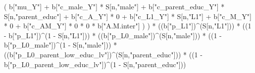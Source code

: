 \documentclass[
]{book}
\newenvironment{Shaded}{\begin{snugshade}}{\end{snugshade}}
\newcommand{\DecValTok}[1]{\textcolor[rgb]{0.00,0.00,0.81}{#1}}
\newcommand{\NormalTok}[1]{#1}
\newcommand{\SpecialCharTok}[1]{\textcolor[rgb]{0.00,0.00,0.00}{#1}}
\newcommand{\StringTok}[1]{\textcolor[rgb]{0.31,0.60,0.02}{#1}}
\begin{document}
\begin{Shaded}
\begin{Highlighting}[]
\NormalTok{                          ( b[}\StringTok{"mu\_Y"}\NormalTok{] }\SpecialCharTok{+} 
\NormalTok{                              b[}\StringTok{"c\_male\_Y"}\NormalTok{] }\SpecialCharTok{*}\NormalTok{ S[n,}\StringTok{"male"}\NormalTok{] }\SpecialCharTok{+} 
\NormalTok{                              b[}\StringTok{"c\_parent\_educ\_Y"}\NormalTok{] }\SpecialCharTok{*}\NormalTok{ S[n,}\StringTok{"parent\_educ"}\NormalTok{] }\SpecialCharTok{+} 
\NormalTok{                              b[}\StringTok{"c\_A\_Y"}\NormalTok{] }\SpecialCharTok{*} \DecValTok{0} \SpecialCharTok{+} 
\NormalTok{                              b[}\StringTok{"c\_L1\_Y"}\NormalTok{] }\SpecialCharTok{*}\NormalTok{ S[n,}\StringTok{"L1"}\NormalTok{] }\SpecialCharTok{+}
\NormalTok{                              b[}\StringTok{"c\_M\_Y"}\NormalTok{] }\SpecialCharTok{*} \DecValTok{0} \SpecialCharTok{+}
\NormalTok{                              b[}\StringTok{"c\_AM\_Y"}\NormalTok{] }\SpecialCharTok{*} \DecValTok{0} \SpecialCharTok{*} \DecValTok{0} \SpecialCharTok{*}\NormalTok{ b[}\StringTok{"A.M.inter"}\NormalTok{] ) ) }\SpecialCharTok{*}
\NormalTok{      ((b[}\StringTok{"p\_L1"}\NormalTok{])}\SpecialCharTok{\^{}}\NormalTok{(S[n,}\StringTok{"L1"}\NormalTok{])) }\SpecialCharTok{*}
\NormalTok{      ((}\DecValTok{1} \SpecialCharTok{{-}}\NormalTok{ b[}\StringTok{"p\_L1"}\NormalTok{])}\SpecialCharTok{\^{}}\NormalTok{(}\DecValTok{1} \SpecialCharTok{{-}}\NormalTok{ S[n,}\StringTok{"L1"}\NormalTok{])) }\SpecialCharTok{*}
\NormalTok{      ((b[}\StringTok{"p\_L0\_male"}\NormalTok{])}\SpecialCharTok{\^{}}\NormalTok{(S[n,}\StringTok{"male"}\NormalTok{])) }\SpecialCharTok{*} 
\NormalTok{      ((}\DecValTok{1} \SpecialCharTok{{-}}\NormalTok{ b[}\StringTok{"p\_L0\_male"}\NormalTok{])}\SpecialCharTok{\^{}}\NormalTok{(}\DecValTok{1} \SpecialCharTok{{-}}\NormalTok{ S[n,}\StringTok{"male"}\NormalTok{])) }\SpecialCharTok{*} 
\NormalTok{      ((b[}\StringTok{"p\_L0\_parent\_low\_educ\_lv"}\NormalTok{])}\SpecialCharTok{\^{}}\NormalTok{(S[n,}\StringTok{"parent\_educ"}\NormalTok{])) }\SpecialCharTok{*}
\NormalTok{      ((}\DecValTok{1} \SpecialCharTok{{-}}\NormalTok{ b[}\StringTok{"p\_L0\_parent\_low\_educ\_lv"}\NormalTok{])}\SpecialCharTok{\^{}}\NormalTok{(}\DecValTok{1} \SpecialCharTok{{-}}\NormalTok{ S[n,}\StringTok{"parent\_educ"}\NormalTok{])) }
    

\end{Highlighting}
\end{Shaded}
\end{document}
